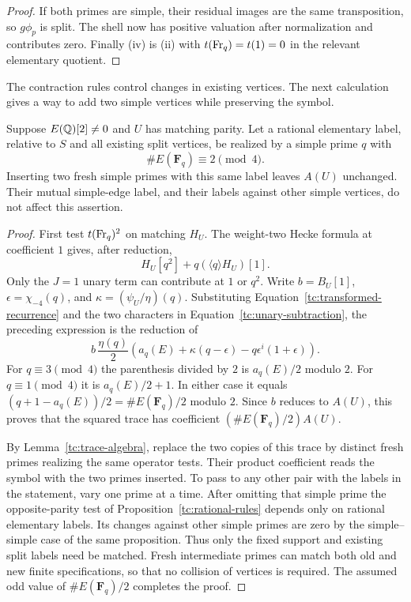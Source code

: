 \begin{proof}
If both primes are simple, their residual images are the same
transposition, so $g\phi_p$ is split.  The shell now has positive
valuation after normalization and contributes zero.  Finally (iv)
is (ii) with $t(\operatorname{Fr}_q)=t(1)=0$ in the relevant elementary quotient.
\end{proof}

The contraction rules control changes in existing vertices. The next
calculation gives a way to add two simple vertices while preserving the
symbol.

\begin{proposition}
\label{tc:simple-twins}
Suppose $E(\mathbb Q)[2]\ne0$ and $U$ has matching parity.  Let a rational
elementary label, relative to $S$ and all existing split vertices,
be realized by a simple prime $q$ with
\[
                         \#E(\mathbf F_q)\equiv2\pmod4.
\]
Inserting two fresh simple primes with this same label leaves $A(U)$
unchanged.  Their mutual simple-edge label, and their labels against
other simple vertices, do not affect this assertion.
\end{proposition}

\begin{proof}
First test $t(\operatorname{Fr}_q)^2$ on matching $H_U$.  The weight-two Hecke
formula at coefficient $1$ gives, after reduction,
\[
                    H_U[q^2]+q(\langle q\rangle H_U)[1].
\]
Only the $J=1$ unary term can contribute at $1$ or $q^2$.
Write $b=B_U[1]$, $\epsilon=\chi_{-4}(q)$, and
$\kappa=(\psi_U/\eta)(q)$.  Substituting
Equation~\eqref{tc:transformed-recurrence} and the two characters in
Equation~\eqref{tc:unary-subtraction}, the preceding expression is
the reduction of
\begin{equation}
 b\,\frac{\eta(q)}2
 \left(a_q(E)+\kappa(q-\epsilon)
                 -q\epsilon^i(1+\epsilon)\right).
 \label{tc:twin-calculation}
\end{equation}
For $q\equiv3\pmod4$ the parenthesis divided by $2$ is
$a_q(E)/2$ modulo $2$.  For $q\equiv1\pmod4$ it is
$a_q(E)/2+1$.  In either case it equals
$(q+1-a_q(E))/2=\#E(\mathbf F_q)/2$ modulo $2$.
Since $b$ reduces to $A(U)$, this proves that the squared trace
has coefficient $(\#E(\mathbf F_q)/2)A(U)$.

By Lemma~\ref{tc:trace-algebra}, replace the two copies of this
trace by distinct fresh primes realizing the same operator tests.
Their product coefficient reads the symbol with the two primes
inserted.  To pass to any other pair with the labels in the
statement, vary one prime at a time.  After omitting that simple
prime the opposite-parity test of
Proposition~\ref{tc:rational-rules} depends only on rational
elementary labels.  Its changes against other simple primes are
zero by the simple--simple case of the same proposition.  Thus
only the fixed support and existing split labels need be matched.
Fresh intermediate primes can match both old and new finite
specifications, so that no collision of vertices is required.
The assumed odd value of $\#E(\mathbf F_q)/2$ completes the proof.
\end{proof}

